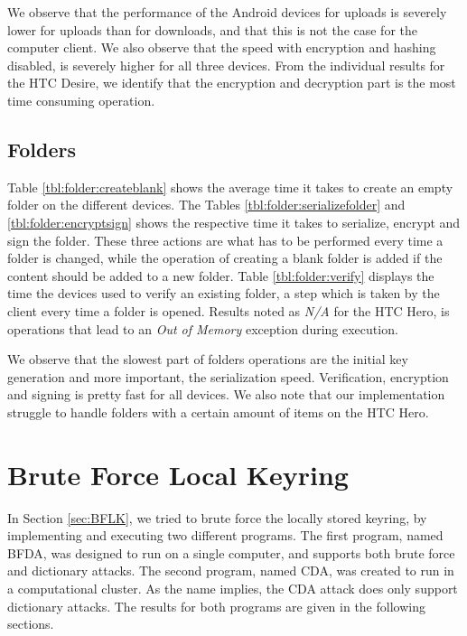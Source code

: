 \documentclass[pdftex,english,10pt,b5paper,twoside]{book}
\begin{document}
We observe that the performance of the Android devices for uploads is severely
lower for uploads than for downloads, and that this is not the case for the
computer client. We also observe that the speed with encryption and hashing
disabled, is severely higher for all three devices. From the individual
results for the HTC Desire, we identify that the encryption and decryption
part is the most time consuming operation.

\subsection{Folders}

Table \ref{tbl:folder:createblank} shows the average time it takes to create an
empty folder on the different devices. The Tables
\ref{tbl:folder:serializefolder} and \ref{tbl:folder:encryptsign} shows the
respective time it takes to serialize, encrypt and sign the folder. These three
actions are what has to be performed every time a folder is changed, while the
operation of creating a blank folder is added if the content should be added to
a new folder. Table \ref{tbl:folder:verify} displays the time the devices used
to verify an existing folder, a step which is taken by the client every time a
folder is opened. Results noted as \emph{N/A} for the HTC Hero, is operations
that lead to an \emph{Out of Memory} exception during execution.






We observe that the slowest part of folders operations are the initial key
generation and more important, the serialization speed. Verification,
encryption and signing is pretty fast for all devices. We also note that our
implementation struggle to handle folders with a certain amount of items on the
HTC Hero.

\section{Brute Force Local Keyring}
\label{sec:R:BFLK}

In Section \ref{sec:BFLK}, we tried to brute force the locally stored keyring,
by implementing and executing two different programs. The first program, named
\acf{BFDA}, was designed to run on a single computer, and supports both brute
force and dictionary attacks. The second program, named \acf{CDA}, was created
to run in a computational cluster. As the name implies, the \ac{CDA} attack
does only support dictionary attacks. The results for both programs are given
in the following sections.
\end{document}

